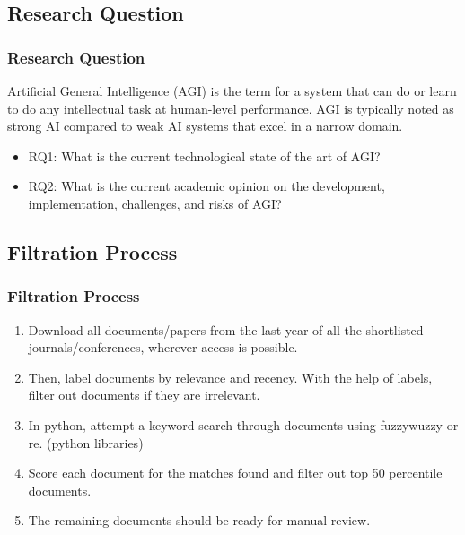 \documentclass[
	11pt, %
]{beamer}
\begin{document}
\subsection{Research Question}

\begin{frame}
	\frametitle{Research Question}
    

    Artificial General Intelligence (AGI) is the term for a system that can do or learn to do any intellectual task at human-level performance. AGI is typically noted as strong AI compared to weak AI systems that excel in a narrow domain.
       
	\bigskip %

	\begin{itemize}
		\item RQ1: What is the current technological state of the art of AGI?
        \bigskip %
        \item RQ2: What is the current academic opinion on the development, implementation, challenges, and risks of AGI?

	\end{itemize}
    
\end{frame}


\subsection{Filtration Process}
\begin{frame}
	\frametitle{Filtration Process}
	
	\bigskip %
	
	\begin{enumerate}
		\item Download all documents/papers from the last year of all the shortlisted journals/conferences, wherever access is possible.
  
		\bigskip %
	    \item Then, label documents by relevance and recency. With the help of labels, filter out documents if they are irrelevant.
     
		\bigskip %
	    \item In python, attempt a keyword search through documents using fuzzywuzzy or re. (python libraries)
     
        \bigskip %
        \item Score each document for the matches found and filter out top 50 percentile documents.

        \bigskip %
        \item The remaining documents should be ready for manual review.

	\end{enumerate}
\end{frame}
\end{document}

